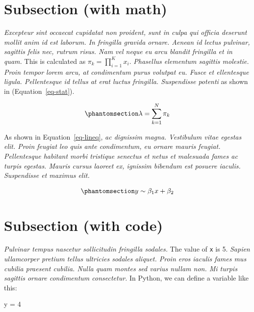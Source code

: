 \documentclass[
  a4paper,
]{scrbook}
\newenvironment{Shaded}{\begin{snugshade}}{\end{snugshade}}
\newcommand{\DecValTok}[1]{\textcolor[rgb]{0.69,0.50,0.00}{#1}}
\newcommand{\NormalTok}[1]{\textcolor[rgb]{0.12,0.11,0.11}{#1}}
\newcommand{\OperatorTok}[1]{\textcolor[rgb]{0.12,0.11,0.11}{#1}}
\let\oldemph\emph
\renewcommand\emph[1]{\oldemph{\color{gray}#1}}
\begin{document}
\section{Subsection (with math)}\label{subsection-with-math}

\emph{Excepteur sint occaecat cupidatat non proident, sunt in culpa qui
officia deserunt mollit anim id est laborum. In fringilla gravida
ornare. Aenean id lectus pulvinar, sagittis felis nec, rutrum risus. Nam
vel neque eu arcu blandit fringilla et in quam.} This is calculated as
\(\pi_k = \prod_{i=1}^K x_i\). \emph{Phasellus elementum sagittis
molestie. Proin tempor lorem arcu, at condimentum purus volutpat eu.
Fusce et ellentesque ligula. Pellentesque id tellus at erat luctus
fringilla. Suspendisse potenti} as shown in (Equation~\ref{eq-stat}).

\begin{equation}\phantomsection\label{eq-stat}{
\lambda = \sum_{k=1}^N \pi_k
}\end{equation}

As shown in Equation~\ref{eq-lineq}, \emph{ac dignissim magna.
Vestibulum vitae egestas elit. Proin feugiat leo quis ante condimentum,
eu ornare mauris feugiat. Pellentesque habitant morbi tristique senectus
et netus et malesuada fames ac turpis egestas. Mauris cursus laoreet ex,
ignissim bibendum est posuere iaculis. Suspendisse et maximus elit.}

\begin{equation}\phantomsection\label{eq-lineq}{
y \sim \beta_1 x + \beta_2
}\end{equation}

\section{Subsection (with code)}\label{subsection-with-code}

\emph{Pulvinar tempus nascetur sollicitudin fringilla sodales.} The
value of \texttt{x} is 5. \emph{Sapien ullamcorper pretium tellus
ultricies sodales aliquet. Proin eros iaculis fames mus cubilia praesent
cubilia. Nulla quam montes sed varius nullam non. Mi turpis sagittis
ornare condimentum consectetur.} In Python, we can define a variable
like this:

\begin{Shaded}
\begin{Highlighting}[]
\NormalTok{y }\OperatorTok{=} \DecValTok{4}
\end{Highlighting}
\end{Shaded}
\end{document}
